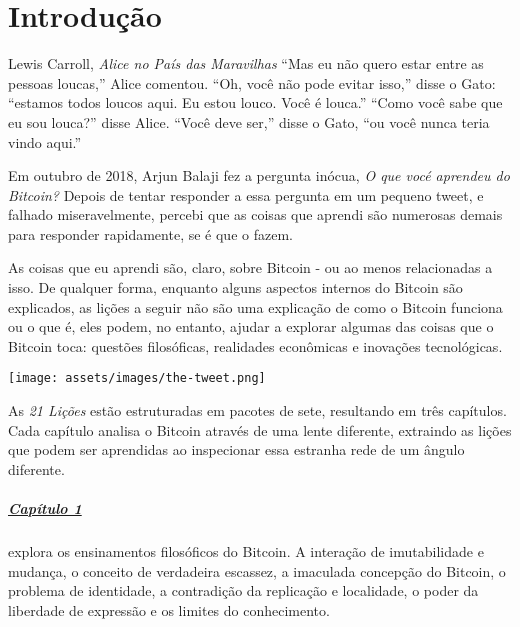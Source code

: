 \chapter*{Introdução}
\label{ch:introduction}

\begin{chapquote}{Lewis Carroll, \textit{Alice no País das Maravilhas}}
\enquote{Mas eu não quero estar entre as pessoas loucas,} Alice comentou. \enquote{Oh, você não pode evitar isso,} disse o Gato: \enquote{estamos todos loucos aqui. Eu estou louco. Você é louca.} \enquote{Como
você sabe que eu sou louca?} disse Alice. \enquote{Você deve ser,} disse o Gato, \enquote{ou você nunca teria vindo aqui.}
\end{chapquote}

Em outubro de 2018, Arjun Balaji fez a pergunta inócua,
\textit{O que vocé aprendeu do Bitcoin?} Depois de tentar responder a essa
pergunta em um pequeno tweet, e falhado miseravelmente, percebi que as coisas que
aprendi são numerosas demais para responder rapidamente, se é que o fazem.

As coisas que eu aprendi são, claro, sobre Bitcoin - ou ao menos relacionadas a isso. De qualquer forma, enquanto alguns aspectos internos do Bitcoin são explicados, as lições a seguir não são uma explicação de como o Bitcoin funciona ou o que é,
eles podem, no entanto, ajudar a explorar algumas das coisas que o Bitcoin toca:
questões filosóficas, realidades econômicas e inovações tecnológicas.

\begin{center}
  \texttt{[image: assets/images/the-tweet.png]}
\end{center}

As \textit{21 Lições} estão estruturadas em pacotes de sete, resultando em três
capítulos. Cada capítulo analisa o Bitcoin através de uma lente diferente, extraindo
as lições que podem ser aprendidas ao inspecionar essa estranha rede de um ângulo diferente.

\paragraph{\hyperref[ch:philosophy]{Capítulo 1}}{explora os ensinamentos filosóficos do Bitcoin. A interação de imutabilidade e mudança, o conceito de verdadeira escassez, a imaculada concepção do Bitcoin, o problema de identidade, a contradição da replicação e localidade, o poder da liberdade de expressão e os limites do conhecimento.
}

